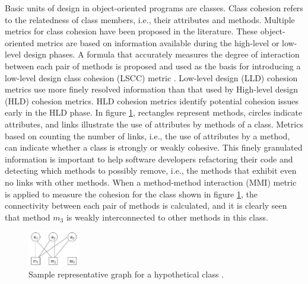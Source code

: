 Basic units of design in object-oriented programs are classes. Class cohesion refers to the relatedness of class members, i.e., their attributes and methods. Multiple metrics for class cohesion have been proposed in the literature. These object-oriented metrics are based on information available during the high-level or low-level design phases.
A formula that accurately measures the degree of interaction between each pair of methods is proposed and used as the basis for introducing a low-level design class cohesion (LSCC) metric \cite{b8al2012precise}. Low-level design (LLD) cohesion metrics use more finely resolved information than that used by High-level design (HLD) cohesion metrics. HLD cohesion metrics identify potential cohesion issues early in the HLD phase. 
In figure \ref{fig1}, rectangles represent methods, circles indicate attributes, and links illustrate the use of attributes by methods of a class. Metrics based on counting the number of links, i.e., the use of attributes by a method, can indicate whether a class is strongly or weakly cohesive. This finely granulated information is important to help software developers refactoring their code and detecting which methods to possibly remove, i.e., the methods that exhibit even no links with other methods. When a method-method interaction (MMI) metric is applied to measure the cohesion for the class shown in figure \ref{fig1}, the connectivity between each pair of methods is calculated, and it is clearly seen that method $m_3$ is weakly interconnected to other methods in this class.


\begin{figure}[htbp]
	\centerline{\includegraphics[width=0.2\textwidth]{pictures/am.png}}
	\caption{Sample representative graph for a hypothetical class \cite{b3al2012fault}.}
	\label{fig1}
\end{figure}

